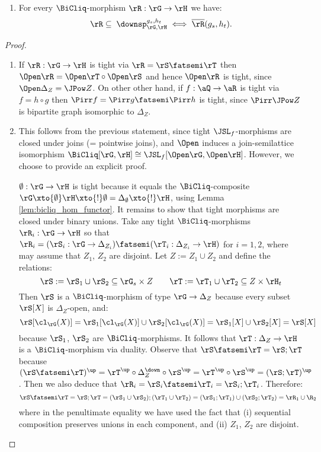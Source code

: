 \documentclass{article}
\begin{document}
\begin{lemma}
\begin{enumerate}
\item
For every $\BiCliq$-morphism $\rR : \rG \to \rH$ we have:
\[
\rR \subseteq \;\downsp_{\rG,\rH}^{g_s,h_t}
\iff \overline{\rR}(g_s,h_t).
\]

\end{enumerate}
\end{lemma}

\begin{proof}
\item
\begin{enumerate}
\item
If $\rR : \rG \to \rH$ is tight via $\rR = \rS \fatsemi \rT$ then $\Open\rR = \Open\rT \circ \Open \rS$ and hence $\Open\rR$ is tight, since $\Open\Delta_Z = \JPow Z$. On other other hand, if $f : \aQ \to \aR$ is tight via $f = h \circ g$ then $\Pirr f = \Pirr g \fatsemi \Pirr h$ is tight, since $\Pirr\JPow Z$ is bipartite graph isomorphic to $\Delta_Z$.

\item
This follows from the previous statement, since tight $\JSL_f$-morphisms are closed under joins (= pointwise joins), and $\Open$ induces a join-semilattice isomorphism $\BiCliq[\rG,\rH] \cong \JSL_f[\Open\rG,\Open\rH]$. However, we choose to provide an explicit proof.

$\emptyset : \rG \to \rH$ is tight because it equals the $\BiCliq$-composite $\rG \xto{\emptyset} \rH \xto{!} \emptyset = \Delta_\emptyset \xto{!} \rH$, using Lemma \ref{lem:bicliq_hom_functor}. It remains to show that tight morphisms are closed under binary unions. Take any tight $\BiCliq$-morphisms $\rR_i : \rG \to \rH$ so that $\rR_i = (\rS_i : \rG \to \Delta_{Z_i}) \fatsemi (\rT_i : \Delta_{Z_i} \to \rH)$ for $i = 1,2$, where may assume that $Z_1$, $Z_2$ are disjoint. Let $Z := Z_1 \cup Z_2$ and define the relations:
\[
\rS := \rS_1 \cup \rS_2 \subseteq \rG_s \times Z
\qquad
\rT := \rT_1 \cup \rT_2 \subseteq Z \times \rH_t
\]
Then $\rS$ is a $\BiCliq$-morphism of type $\rG \to \Delta_Z$ because every subset $\rS[X]$ is $\Delta_Z$-open, and:
\[
\rS[\cl_\rG(X)] 
= \rS_1[\cl_\rG(X)] \cup \rS_2[\cl_\rG(X)] 
= \rS_1[X] \cup \rS_2[X]
= \rS[X]
\]
because $\rS_1$, $\rS_2$ are $\BiCliq$-morphisms. It follows that $\rT : \Delta_Z \to \rH$ is a $\BiCliq$-morphism via duality. Observe that $\rS \fatsemi \rT = \rS ; \rT$ because $(\rS \fatsemi \rT)^\up = \rT^\up \circ \Delta_Z^\down \circ \rS^\up = \rT^\up \circ \rS^\up = (\rS ; \rT)^\up$. Then we also deduce that $\rR_i = \rS_i \fatsemi \rT_i = \rS_i ; \rT_i$. Therefore:
\[
\rS \fatsemi \rT
= \rS ; \rT
= (\rS_1 \cup \rS_2) ; (\rT_1 \cup \rT_2)
= (\rS_1 ; \rT_1) \cup (\rS_2 ; \rT_2)
= \rR_1 \cup \R_2
\]
where in the penultimate equality we have used the fact that (i) sequential composition preserves unions in each component, and (ii) $Z_1$, $Z_2$ are disjoint.


\end{enumerate}
\end{proof}
\end{document}
